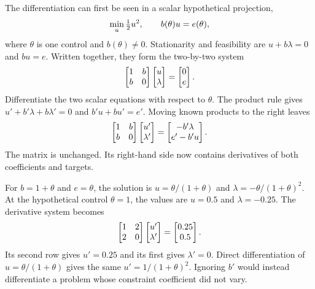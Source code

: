 The differentiation can first be seen in a scalar hypothetical projection,
\begin{equation}
\equationname{Scalar equality-constrained projection with a varying parameter}
\min_u\tfrac12u^2,\qquad b(\theta)u=e(\theta),
\end{equation}
where $\theta$ is one control and $b(\theta)\ne0$. Stationarity and feasibility are $u+b\lambda=0$ and $bu=e$. Written together, they form the two-by-two system
\begin{equation}
\equationname{Optimality system for the scalar parametric projection}
\begin{bmatrix}1&b\\b&0\end{bmatrix}
\begin{bmatrix}u\\\lambda\end{bmatrix}
=\begin{bmatrix}0\\e\end{bmatrix}.
\end{equation}
Differentiate the two scalar equations with respect to $\theta$. The product rule gives $u'+b'\lambda+b\lambda'=0$ and $b'u+bu'=e'$. Moving known products to the right leaves
\begin{equation}
\equationname{Derivative system for the scalar parametric projection}
\begin{bmatrix}1&b\\b&0\end{bmatrix}
\begin{bmatrix}u'\\\lambda'\end{bmatrix}
=\begin{bmatrix}-b'\lambda\\e'-b'u\end{bmatrix}.
\end{equation}
The matrix is unchanged. Its right-hand side now contains derivatives of both coefficients and targets.

For $b=1+\theta$ and $e=\theta$, the solution is $u=\theta/(1+\theta)$ and $\lambda=-\theta/(1+\theta)^2$. At the hypothetical control $\theta=1$, the values are $u=0.5$ and $\lambda=-0.25$. The derivative system becomes
\begin{equation}
\equationname{Numerical example of the parametric projection derivative}
\begin{bmatrix}1&2\\2&0\end{bmatrix}
\begin{bmatrix}u'\\\lambda'\end{bmatrix}
=\begin{bmatrix}0.25\\0.5\end{bmatrix}.
\end{equation}
Its second row gives $u'=0.25$ and its first gives $\lambda'=0$. Direct differentiation of $u=\theta/(1+\theta)$ gives the same $u'=1/(1+\theta)^2$. Ignoring $b'$ would instead differentiate a problem whose constraint coefficient did not vary.

